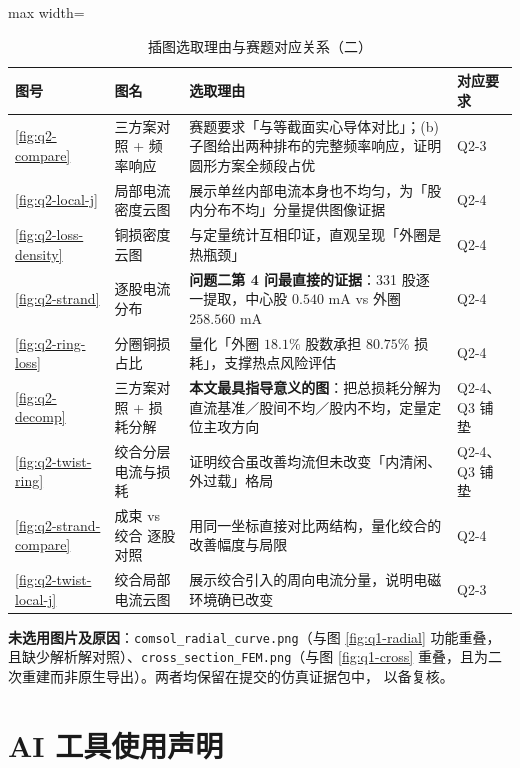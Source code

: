 \documentclass[12pt, a4paper]{ctexart}
\begin{document}
\begin{table}[H]
\centering
\caption{插图选取理由与赛题对应关系（二）}
\label{tab:appendix-figs2}
\small
\begin{adjustbox}{max width=\textwidth}
\begin{tabular}{p{1.15cm} p{2.6cm} p{8.4cm} p{2.15cm}}
\toprule
\textbf{图号} & \textbf{图名} & \textbf{选取理由} & \textbf{对应要求} \\
\midrule
\ref{fig:q2-compare} & 三方案对照 + 频率响应 & 赛题要求「与等截面实心导体对比」；(b) 子图给出两种排布的完整频率响应，证明圆形方案全频段占优 & Q2-3 \\
\ref{fig:q2-local-j} & 局部电流密度云图 & 展示单丝内部电流本身也不均匀，为「股内分布不均」分量提供图像证据 & Q2-4 \\
\ref{fig:q2-loss-density} & 铜损密度云图 & 与定量统计互相印证，直观呈现「外圈是热瓶颈」 & Q2-4 \\
\ref{fig:q2-strand} & 逐股电流分布 & \textbf{问题二第 4 问最直接的证据}：331 股逐一提取，中心股 $0.540$ mA vs 外圈 $258.560$ mA & Q2-4 \\
\ref{fig:q2-ring-loss} & 分圈铜损占比 & 量化「外圈 $18.1\%$ 股数承担 $80.75\%$ 损耗」，支撑热点风险评估 & Q2-4 \\
\ref{fig:q2-decomp} & 三方案对照 + 损耗分解 & \textbf{本文最具指导意义的图}：把总损耗分解为直流基准／股间不均／股内不均，定量定位主攻方向 & Q2-4、Q3 铺垫 \\
\ref{fig:q2-twist-ring} & 绞合分层电流与损耗 & 证明绞合虽改善均流但未改变「内清闲、外过载」格局 & Q2-4、Q3 铺垫 \\
\ref{fig:q2-strand-compare} & 成束 vs 绞合 逐股对照 & 用同一坐标直接对比两结构，量化绞合的改善幅度与局限 & Q2-4 \\
\ref{fig:q2-twist-local-j} & 绞合局部电流云图 & 展示绞合引入的周向电流分量，说明电磁环境确已改变 & Q2-3 \\
\bottomrule
\end{tabular}
\end{adjustbox}
\end{table}


\textbf{未选用图片及原因}：\texttt{comsol\_radial\_curve.png}（与图 \ref{fig:q1-radial}
功能重叠，且缺少解析解对照）、\texttt{cross\_section\_FEM.png}（与图 \ref{fig:q1-cross}
重叠，且为二次重建而非原生导出）。两者均保留在提交的仿真证据包中，
以备复核。

\section{AI 工具使用声明}
\end{document}
